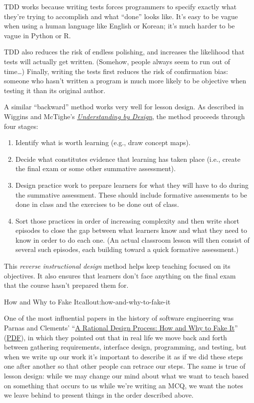 TDD works because writing tests forces programmers to specify exactly
what they're trying to accomplish and what ``done'' looks like. It's
easy to be vague when using a human language like English or Korean;
it's much harder to be vague in Python or R.

TDD also reduces the risk of endless polishing, and increases the
likelihood that tests will actually get written. (Somehow, people always
seem to run out of time\ldots{}) Finally, writing the tests first
reduces the risk of confirmation bias: someone who hasn't written a
program is much more likely to be objective when testing it than its
original author.

A similar ``backward'' method works very well for lesson design. As
described in Wiggins and McTighe's
\emph{\href{http://www.amazon.com/Understanding-Design-Expanded-Grant-Wiggins/dp/0131950843/}{Understanding
by Design}}, the method proceeds through four stages:

\begin{enumerate}
\item
  Identify what is worth learning (e.g., draw concept maps).
\item
  Decide what constitutes evidence that learning has taken place (i.e.,
  create the final exam or some other summative assessment).
\item
  Design practice work to prepare learners for what they will have to do
  during the summative assessment. These should include formative
  assessments to be done in class and the exercises to be done out of
  class.
\item
  Sort those practices in order of increasing complexity and then write
  short episodes to close the gap between what learners know and what
  they need to know in order to do each one. (An actual classroom lesson
  will then consist of several such episodes, each building toward a
  quick formative assessment.)
\end{enumerate}

This \emph{reverse instructional design} method helps keep teaching
focused on its objectives. It also ensures that learners don't face
anything on the final exam that the course hasn't prepared them for.

\begin{callout}{How and Why to Fake It}{callout:how-and-why-to-fake-it}

One of the most influential papers in the history of software
engineering was Parnas and Clements'
``\href{http://dx.doi.org/10.1109/TSE.1986.6312940}{A Rational Design
Process: How and Why to Fake It}''
(\href{http://www.ics.uci.edu/~taylor/classes/121/IEEE86\_Parnas\_Clement.pdf}{PDF}),
in which they pointed out that in real life we move back and forth
between gathering requirements, interface design, programming, and
testing, but when we write up our work it's important to describe it as
if we did these steps one after another so that other people can retrace
our steps. The same is true of lesson design: while we may change our
mind about what we want to teach based on something that occurs to us
while we're writing an MCQ, we want the notes we leave behind to present
things in the order described above.
\end{callout}


